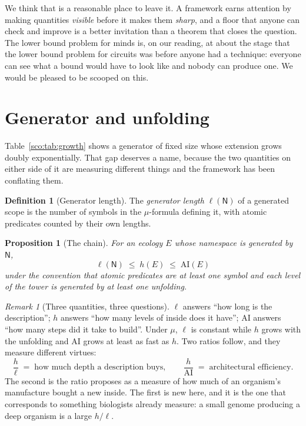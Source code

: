 \documentclass[11pt]{article}
\theoremstyle{plain}
\newtheorem{proposition}[theorem]{Proposition}
\theoremstyle{definition}
\newtheorem{definition}[theorem]{Definition}
\theoremstyle{remark}
\newtheorem{remark}[theorem]{Remark}
\newcommand{\Nsp}{\mathsf{N}}
\newcommand{\AI}{\mathrm{AI}}
\newcommand{\gen}{\ell}
\begin{document}
We think that is a reasonable place to leave it. A framework earns
attention by making quantities \emph{visible} before it makes them
\emph{sharp}, and a floor that anyone can check and improve is a better
invitation than a theorem that closes the question. The lower bound
problem for minds is, on our reading, at about the stage that the lower
bound problem for circuits was before anyone had a technique: everyone can
see what a bound would have to look like and nobody can produce one.
We would be pleased to be scooped on this.

\section{Generator and unfolding}\label{sco:S6}

Table~\ref{sco:tab:growth} shows a generator of fixed size whose extension
grows doubly exponentially. That gap deserves a name, because the two
quantities on either side of it are measuring different things and the
framework has been conflating them.

\begin{definition}[Generator length]\label{sco:def:genlen}
The \emph{generator length} $\gen(\Nsp)$ of a generated scope is the number
of symbols in the $\mu$-formula defining it, with atomic predicates counted
by their own lengths.
\end{definition}

\begin{proposition}[The chain]\label{sco:prop:chain}
For an ecology $E$ whose namespace is generated by $\Nsp$,
\[
  \gen(\Nsp) \;\le\; h(E) \;\le\; \AI(E)
\]
under the convention that atomic predicates are at least one symbol and
each level of the tower is generated by at least one unfolding.
\end{proposition}

\begin{remark}[Three quantities, three questions]\label{sco:rem:three}
$\gen$ answers ``how long is the description''; $h$ answers ``how many
levels of inside does it have''; $\AI$ answers ``how many steps did it take
to build''. Under $\mu$, $\gen$ is constant while $h$ grows with the
unfolding and $\AI$ grows at least as fast as $h$. Two ratios follow, and
they measure different virtues:
\[
  \frac{h}{\gen} \;=\; \text{how much depth a description buys},
  \qquad
  \frac{h}{\AI} \;=\; \text{architectural efficiency}.
\]
The second is the ratio \cite[Rem.~44.2]{book} proposes as a measure of
how much of an organism's manufacture bought a new inside. The first is
new here, and it is the one that corresponds to something biologists
already measure: a small genome producing a deep organism is a large
$h/\gen$.
\end{remark}
\end{document}
